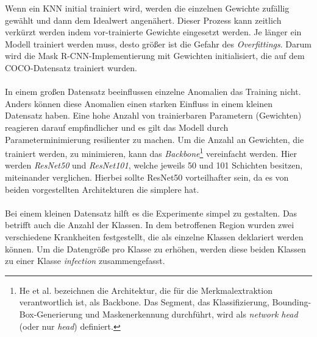 Wenn ein KNN initial trainiert wird, werden die einzelnen Gewichte zufällig gewählt und dann dem Idealwert angenähert. Dieser Prozess kann zeitlich verkürzt werden indem vor-trainierte Gewichte eingesetzt werden. Je länger ein Modell trainiert werden muss, desto größer ist die Gefahr des \textit{Overfittings}. Darum wird die Mask R-CNN-Implementierung mit Gewichten initialisiert, die auf dem COCO-Datensatz trainiert wurden.
\\\\
In einem großen Datensatz beeinflussen einzelne Anomalien das Training nicht. Anders können diese Anomalien einen starken Einfluss in einem kleinen Datensatz haben. Eine hohe Anzahl von trainierbaren Parametern (Gewichten) reagieren darauf empfindlicher und es gilt das Modell durch Parameterminimierung resilienter zu machen. Um die Anzahl an Gewichten, die trainiert werden, zu minimieren, kann das \textit{Backbone}\footnote{He et al. bezeichnen die Architektur, die für die Merkmalextraktion verantwortlich ist, als Backbone. Das Segment, das Klassifizierung, Bounding-Box-Generierung und Maskenerkennung durchführt, wird als \textit{network head} (oder nur \textit{head}) definiert.\cite{ref:maskrcnn}} vereinfacht werden. Hier werden \textit{ResNet50} und \textit{ResNet101}, welche jeweils 50 und 101 Schichten besitzen, miteinander verglichen. Hierbei sollte ResNet50 vorteilhafter sein, da es von beiden vorgestellten Architekturen die simplere hat.
\\\\
Bei einem kleinen Datensatz hilft es die Experimente simpel zu gestalten. Das betrifft auch die Anzahl der Klassen. In dem betroffenen Region wurden zwei verschiedene Krankheiten festgestellt, die als einzelne Klassen deklariert werden können. Um die Datengröße pro Klasse zu erhöhen, werden diese beiden Klassen zu einer Klasse \textit{infection} zusammengefasst. 